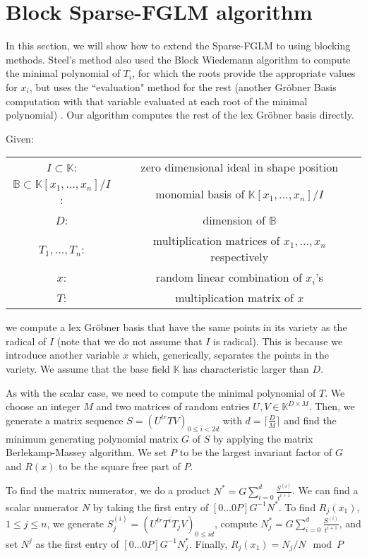 \documentclass[12pt]{article}
\def\K {\ensuremath{\mathbb{K}}}
\def\K{\mathbb{K}}
\begin{document}
\newpage
\section{Block Sparse-FGLM algorithm}
In this section, we will show how to extend the Sparse-FGLM
to using blocking methods. Steel's method also used the
Block Wiedemann algorithm to compute the minimal polynomial
of $T_i$, for which the roots provide the appropriate
values for $x_i$,
but uses the ``evaluation" method for the rest
(another Gr\"obner Basis computation with that variable
evaluated at each root of the minimal polynomial) \cite{Steel15}.
Our algorithm computes the rest of the lex
Gr\"obner basis directly.

Given:
\begin{center}
	\begin{tabular}{c c}
		$I \subset \mathbb{K}$:& zero dimensional ideal
		in shape position\\
		$\mathbb{B} \subset \mathbb{K}[x_1,\dots,x_n]/I$:&
		monomial basis of $\mathbb{K}[x_1,\dots,x_n]/I$\\
		$D$: & dimension of $\mathbb{B}$\\
		$T_1, \dots,T_n$:& multiplication matrices of
		$x_1 ,\dots,x_n$ respectively\\
		$x$:& random linear combination of $x_i$'s\\
		$T$:& multiplication matrix of $x$
	\end{tabular}
\end{center}
we compute a lex Gr\"obner basis that have the same points
in its variety as the radical of $I$ 
(note that we do not assume that $I$ is radical).
This is because we introduce another variable $x$ which,
generically, separates the points in the variety.
We assume that the base field $\K$ has characteristic
larger than $D$.

As with the scalar case, we need to compute the minimal polynomial
of $T$. We choose an integer $M$ and two matrices of random
entries $U,V \in \K^{D\times M}$. Then, we generate a matrix
sequence $S = (U^{tr}TV)_{0 \le i < 2d}$ with
$d = \lceil \frac{D}{M} \rceil$ and find the minimum generating
polynomial matrix $G$ of $S$ by applying the matrix
Berlekamp-Massey algorithm. We set $P$ to be the largest
invariant factor of $G$ and $R(x)$ to
be the square free part of $P$.

To find the matrix numerator, we do a product 
$N^* = G\sum_{i=0}^{d} \frac{S^{(i)}} {t^{i+1}}$. We can find a
scalar numerator $N$ by taking the first entry of 
$[0 \dots 0 P] G^{-1} N^*$. To find $R_j(x_1)$, $1 \le j \le n$,
we generate $S^{(i)}_j = (U^{tr} T^i T_j V)_{0 \le i d}$,
compute $N^*_j = G \sum_{i=0}^{d} \frac{S^{(i)}} {t^{i+1}}$,
and set $N^j$ as the first entry of 
$[0 \dots 0 P] G^{-1} N^*_j$. Finally, $R_j(x_1) = N_j / N \mod P$
\end{document}
